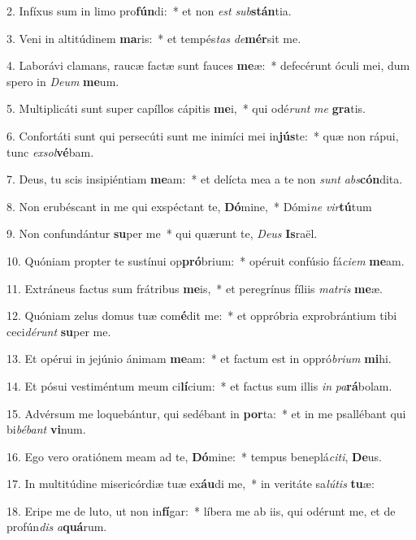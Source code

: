 2. Infíxus sum in limo pro\textbf{fún}di:~*  et non \textit{est} \textit{sub}\textbf{stán}tia.\

3. Veni in altitúdinem \textbf{ma}ris:~*  et tempés\textit{tas} \textit{de}\textbf{mér}sit me.\

4. Laborávi clamans, raucæ factæ sunt fauces \textbf{me}æ:~*  defecérunt óculi mei, dum spero in \textit{De}\textit{um} \textbf{me}um.\

5. Multiplicáti sunt super capíllos cápitis \textbf{me}i,~*  qui odé\textit{runt} \textit{me} \textbf{gra}tis.\

6. Confortáti sunt qui persecúti sunt me inimíci mei in\textbf{jús}te:~*  quæ non rápui, tunc \textit{ex}\textit{sol}\textbf{vé}bam.\

7. Deus, tu scis insipiéntiam \textbf{me}am:~*  et delícta mea a te non \textit{sunt} \textit{abs}\textbf{cón}dita.\

8. Non erubéscant in me qui exspéctant te, \textbf{Dó}mine,~*  Dómi\textit{ne} \textit{vir}\textbf{tú}tum\

9. Non confundántur \textbf{su}per me~*  qui quærunt te, \textit{De}\textit{us} \textbf{Is}raël.\

10. Quóniam propter te sustínui op\textbf{pró}brium:~*  opéruit confúsio fá\textit{ci}\textit{em} \textbf{me}am.\

11. Extráneus factus sum frátribus \textbf{me}is,~*  et peregrínus fíliis \textit{ma}\textit{tris} \textbf{me}æ.\

12. Quóniam zelus domus tuæ com\textbf{é}dit me:~*  et oppróbria exprobrántium tibi ceci\textit{dé}\textit{runt} \textbf{su}per me.\

13. Et opérui in jejúnio ánimam \textbf{me}am:~*  et factum est in oppró\textit{bri}\textit{um} \textbf{mi}hi.\

14. Et pósui vestiméntum meum ci\textbf{lí}cium:~*  et factus sum illis \textit{in} \textit{pa}\textbf{rá}bolam.\

15. Advérsum me loquebántur, qui sedébant in \textbf{por}ta:~*  et in me psallébant qui bi\textit{bé}\textit{bant} \textbf{vi}num.\

16. Ego vero oratiónem meam ad te, \textbf{Dó}mine:~*  tempus beneplá\textit{ci}\textit{ti}, \textbf{De}us.\

17. In multitúdine misericórdiæ tuæ ex\textbf{áu}di me,~*  in veritáte sa\textit{lú}\textit{tis} \textbf{tu}æ:\

18. Eripe me de luto, ut non in\textbf{fí}gar:~*  líbera me ab iis, qui odérunt me, et de profún\textit{dis} \textit{a}\textbf{quá}rum.\

